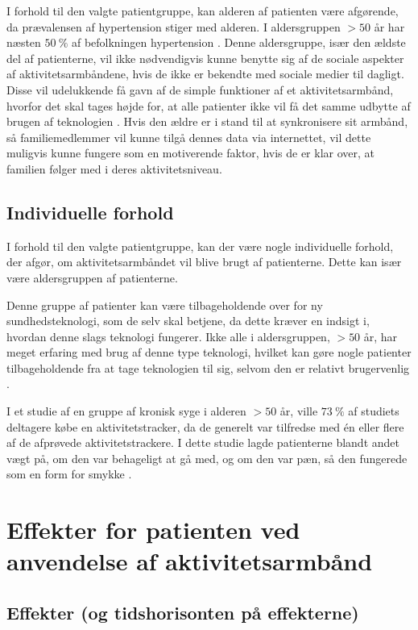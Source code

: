I forhold til den valgte patientgruppe, kan alderen af patienten være afgørende, da prævalensen af hypertension stiger med alderen. I aldersgruppen $>50$ år har næsten $50~\%$ af befolkningen hypertension \citep{kronborg2008}. Denne aldersgruppe, især den ældste del af patienterne, vil ikke nødvendigvis kunne benytte sig af de sociale aspekter af aktivitetsarmbåndene, hvis de ikke er bekendte med sociale medier til dagligt. Disse vil udelukkende få gavn af de simple funktioner af et aktivitetsarmbånd, hvorfor det skal tages højde for, at alle patienter ikke vil få det samme udbytte af brugen af teknologien \citep{mercer2016}. Hvis den ældre er i stand til at synkronisere sit armbånd, så familiemedlemmer vil kunne tilgå dennes data via internettet, vil dette muligvis kunne fungere som en motiverende faktor, hvis de er klar over, at familien følger med i deres aktivitetsniveau.

\subsection{Individuelle forhold}
I forhold til den valgte patientgruppe, kan der være nogle individuelle forhold, der afgør, om aktivitetsarmbåndet vil blive brugt af patienterne. Dette kan især være aldersgruppen af patienterne. 

Denne gruppe af patienter kan være tilbageholdende over for ny sundhedsteknologi, som de selv skal betjene, da dette kræver en indsigt i, hvordan denne slags teknologi fungerer. Ikke alle i aldersgruppen, $>50$ år, har meget erfaring med brug af denne type teknologi, hvilket kan gøre nogle patienter tilbageholdende fra at tage teknologien til sig, selvom den er relativt brugervenlig \citep{mercer2016}. 

I et studie af en gruppe af kronisk syge i alderen $>50$ år, ville $73~\%$ af studiets deltagere købe en aktivitetstracker, da de generelt var tilfredse med én eller flere af de afprøvede aktivitetstrackere. I dette studie lagde patienterne blandt andet vægt på, om den var behageligt at gå med, og om den var pæn, så den fungerede som en form for smykke \citep{mercer2016}.

\section{Effekter for patienten ved anvendelse af aktivitetsarmbånd}
\subsection{Effekter (og tidshorisonten på effekterne)}
